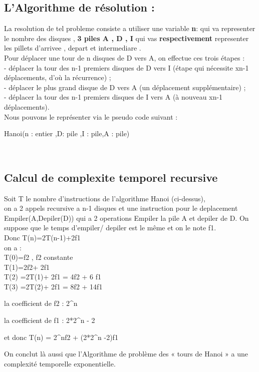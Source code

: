 \subsection{L'Algorithme de résolution :}
La resolution de tel probleme consiste a utiliser une variable
\textbf{n}:  qui va representer le nombre des disques , \textbf{3 piles A , D , I} qui vas \textbf{respectivement} representer les pillets d'arrivee , depart et intermediare . \\ 
Pour déplacer une tour de n disques de D vers A, on effectue ces trois étapes : \\
- déplacer la tour des n-1 premiers disques de D vers I (étape qui nécessite xn-1 déplacements, d’où la récurrence) ;\\
- déplacer le plus grand disque de D vers A (un déplacement supplémentaire) ;\\
- déplacer la tour des n-1 premiers disques de I vers A (à nouveau xn-1 déplacements).\\
Nous pouvons le représenter via le pseudo code suivant :
\par
\begin{function}[H]
    \caption{Hanoi(n : entier ,D: pile ,I : pile,A : pile)}
\end{function}
\\
\subsection{Calcul de complexite temporel recursive}
Soit T le nombre d'instructions de l'algorithme Hanoi (ci-dessus),  \\
on a 2 appels recursive a n-1 disques et une instruction pour le deplacement Empiler(A,Depiler(D)) qui a 2 operations Empiler la pile A et depiler de D. On suppose que le temps d'empiler/ depiler est le même et on le note f1. \\
Donc T(n)=2T(n-1)+2f1\\
on a : \\
T(0)=f2 , f2 constante \\
T(1)=2f2+ 2f1\\
T(2) =2T(1)+ 2f1 = 4f2 + 6 f1 \\
T(3) =2T(2)+ 2f1 =  8f2 + 14f1 \\
\par
la coefficient de f2 : 2^n  \\ 
\par
la coefficient de f1 : 2*2^n - 2 \\
\par
et donc T(n) = 2^nf2 + (2*2^n -2)f1 \\
\par
On conclut là aussi que l'Algorithme de problème des « tours de Hanoi » a une complexité temporelle exponentielle.\\

